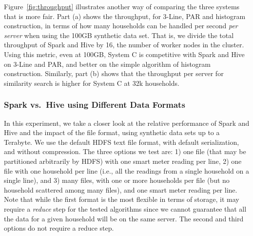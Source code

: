 \documentclass[prodmode,acmtods]{acmsmall}
\begin{document}
Figure~\ref{fig:throughput} illustrates another way of comparing the three systems that is more fair.  Part (a) shows the throughput, for 3-Line, PAR and histogram construction, in terms of how many households can be handled per second \emph{per server} when using the 100GB synthetic data set.  That is, we divide the total throughput of Spark and Hive by 16, the number of worker nodes in the cluster.  Using this metric, even at 100GB, System C is competitive with Spark and Hive on 3-Line and PAR, and better on the simple algorithm of histogram construction.  Similarly, part (b) shows that the throughput per server for similarity search is higher for System C at 32k households.  

\begin{figure*}[t]
 \centering
 \hspace{10pt}
 \caption{A comparison of throughput per server of System C, Spark and Hive.}
  \label{fig:throughput}
\end{figure*}


\subsubsection{Spark vs.\ Hive using Different Data Formats}
\label{sec:offline_cluster}

In this experiment, we take a closer look at the relative performance of Spark and Hive and the impact of the file format, using synthetic data sets up to a Terabyte.  We use the default HDFS text file format, with default serialization, and without compression.  The three options we test are: 1) one file (that may be partitioned arbitrarily by HDFS) with one smart meter reading per line,  2) one file with one household per line (i.e., all the readings from a single household on a single line), and 3) many files, with one or more households per file (but no household scattered among many files), and one smart meter reading per line.  Note that while the first format is the most flexible in terms of storage, it may require a \emph{reduce} step for the tested algorithms since we cannot guarantee that all the data for a given household will be on the same server.  The second and third options do not require a reduce step.
\end{document}
